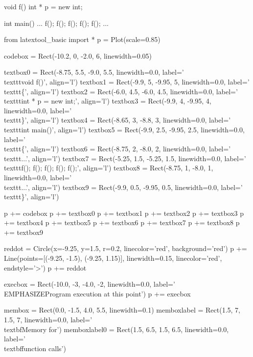 \begin{consolethree}[escapeinside=||]
void f()
{
    int * p = new int;
}

int main()
{
    ...
    f(); f(); f(); f(); f();
    ...
}
\end{consolethree}
\begin{python}
from latextool_basic import *
p = Plot(scale=0.85)

codebox = Rect(-10.2, 0, -2.0, 6, linewidth=0.05)

textbox0 = Rect(-8.75, 5.5, -9.0, 5.5, linewidth=0.0, label='\\texttt{void f()}', align='l')
textbox1 = Rect(-9.9, 5, -9.95, 5, linewidth=0.0, label='\\texttt{\{}', align='l')
textbox2 = Rect(-6.0, 4.5, -6.0, 4.5, linewidth=0.0, label='\\texttt{int * p = new int;}', align='l')
textbox3 = Rect(-9.9, 4, -9.95, 4, linewidth=0.0, label='\\texttt{\}}', align='l')
textbox4 = Rect(-8.65, 3, -8.8, 3, linewidth=0.0, label='\\texttt{int main()}', align='l')
textbox5 = Rect(-9.9, 2.5, -9.95, 2.5, linewidth=0.0, label='\\texttt{\{}', align='l')
textbox6 = Rect(-8.75, 2, -8.0, 2, linewidth=0.0, label='\\texttt{...}', align='l')
textbox7 = Rect(-5.25, 1.5, -5.25, 1.5, linewidth=0.0, label='\\texttt{f(); f(); f(); f(); f();}', align='l')
textbox8 = Rect(-8.75, 1, -8.0, 1, linewidth=0.0, label='\\texttt{...}', align='l')
textbox9 = Rect(-9.9, 0.5, -9.95, 0.5, linewidth=0.0, label='\\texttt{\}}', align='l')

p += codebox
p += textbox0
p += textbox1
p += textbox2
p += textbox3
p += textbox4
p += textbox5
p += textbox6
p += textbox7
p += textbox8
p += textbox9

reddot = Circle(x=-9.25, y=1.5, r=0.2, linecolor='red', background='red')
p += Line(points=[(-9.25, -1.5), (-9.25, 1.15)], linewidth=0.15, linecolor='red', endstyle='>')
p += reddot

execbox = Rect(-10.0, -3, -4.0, -2, linewidth=0.0,
               label='\\EMPHASIZE{Program execution at this point}')
p += execbox

membox = Rect(0.0, -1.5, 4.0, 5.5, linewidth=0.1)
memboxlabel = Rect(1.5, 7, 1.5, 7, linewidth=0.0, label='\\textbf{Memory for}')
memboxlabel0 = Rect(1.5, 6.5, 1.5, 6.5, linewidth=0.0, label='\\textbf{function calls}')


\end{python}
